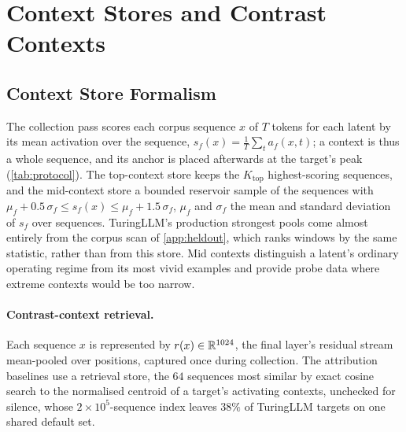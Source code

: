 \documentclass[10pt]{article}
\begin{document}

\section{Context Stores and Contrast Contexts}
\label{app:stores}

\subsection{Context Store Formalism}

The collection pass scores each corpus sequence $x$ of $T$ tokens for each latent by its mean activation over the sequence, $s_f(x) = \frac{1}{T}\sum_{t} a_f(x,t)$; a context is thus a whole sequence, and its anchor is placed afterwards at the target's peak (\cref{tab:protocol}).
The top-context store keeps the $K_{\mathrm{top}}$ highest-scoring sequences, and the mid-context store a bounded reservoir sample of the sequences with $\mu_f + 0.5\,\sigma_f \leq s_f(x) \leq \mu_f + 1.5\,\sigma_f$, $\mu_f$ and $\sigma_f$ the mean and standard deviation of $s_f$ over sequences.
TuringLLM's production strongest pools come almost entirely from the corpus scan of \cref{app:heldout}, which ranks windows by the same statistic, rather than from this store.
Mid contexts distinguish a latent's ordinary operating regime from its most vivid examples and provide probe data where extreme contexts would be too narrow.

\paragraph{Contrast-context retrieval.}
Each sequence $x$ is represented by $r(x) \in \mathbb{R}^{1024}$, the final layer's residual stream mean-pooled over positions, captured once during collection.
The attribution baselines use a retrieval store, the $64$ sequences most similar by exact cosine search to the normalised centroid of a target's activating contexts, unchecked for silence, whose $2 \times 10^{5}$-sequence index leaves $38\%$ of TuringLLM targets on one shared default set.
\end{document}
